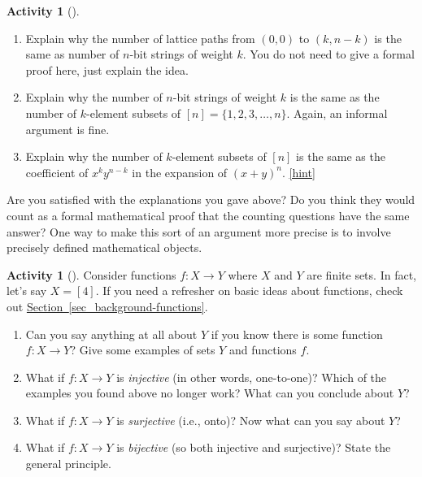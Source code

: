 \documentclass[10pt,]{book}
\theoremstyle{plain}
\theoremstyle{definition}
\theoremstyle{definition}
\theoremstyle{definition}
\newtheorem{activity}[project]{Activity}
\numberwithin{equation}{chapter}
\begin{document}
\begin{activity}[]\label{activity-61}
\leavevmode%
\begin{enumerate}[font=\bfseries,label=(\alph*),ref=\alph*]
\item\label{task-88} \hypertarget{p-507}{}%
Explain why the number of lattice paths from \((0,0)\) to \((k,n-k)\) is the same as number of \(n\)-bit strings of weight \(k\). You do not need to give a formal proof here, just explain the idea.%
\item\label{task-89} \hypertarget{p-508}{}%
Explain why the number of \(n\)-bit strings of weight \(k\) is the same as the number of \(k\)-element subsets of \([n] = \{1,2,3,\ldots, n\}\).   Again, an informal argument is fine.%
\item\label{task-90} \hypertarget{p-509}{}%
Explain why the number of \(k\)-element subsets of \([n]\) is the same as the coefficient of \(x^ky^{n-k}\) in the expansion of \((x+y)^n\).%
\hfill{\tiny\hyperlink{a-68.c}{[hint]}\hypertarget{q-68.c}{}}\end{enumerate}
\end{activity}
\hypertarget{p-511}{}%
Are you satisfied with the explanations you gave above?  Do you think they would count as a formal mathematical proof that the counting questions have the same answer?  One way to make this sort of an argument more precise is to involve precisely defined mathematical objects.%
\begin{activity}[]\label{activity-62}
\hypertarget{p-512}{}%
Consider functions \(f:X \to Y\) where \(X\) and \(Y\) are finite sets.  In fact, let's say \(X = [4]\). If you need a refresher on basic ideas about functions, check out \hyperref[sec_background-functions]{Section~\ref{sec_background-functions}}.%
\begin{enumerate}[font=\bfseries,label=(\alph*),ref=\alph*]
\item\label{task-91} \hypertarget{p-513}{}%
Can you say anything at all about \(Y\) if you know there is some function \(f:X \to Y\)?  Give some examples of sets \(Y\) and functions \(f\).%
\item\label{task-92} \hypertarget{p-514}{}%
What if \(f:X \to Y\) is \emph{injective} (in other words, one-to-one)?  Which of the examples you found above no longer work?  What can you conclude about \(Y\)?%
\item\label{task-93} \hypertarget{p-515}{}%
What if \(f:X \to Y\) is \emph{surjective} (i.e., onto)?  Now what can you say about \(Y\)?%
\item\label{task-94} \hypertarget{p-516}{}%
What if \(f:X\to Y\) is \emph{bijective} (so both injective and surjective)?  State the general principle.%
\end{enumerate}
\end{activity}
\end{document}
